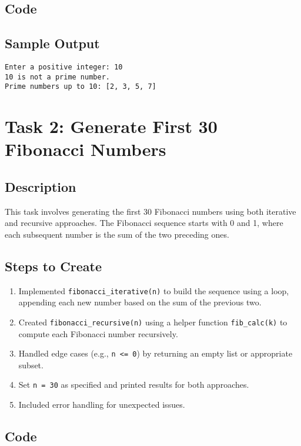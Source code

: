 \documentclass[a4paper,12pt]{article}
\begin{document}
\subsection{Code}


\subsection{Sample Output}
\begin{verbatim}
Enter a positive integer: 10
10 is not a prime number.
Prime numbers up to 10: [2, 3, 5, 7]
\end{verbatim}

\section{Task 2: Generate First 30 Fibonacci Numbers}
\subsection{Description}
This task involves generating the first 30 Fibonacci numbers using both iterative and recursive approaches. The Fibonacci sequence starts with 0 and 1, where each subsequent number is the sum of the two preceding ones.

\subsection{Steps to Create}
\begin{enumerate}
    \item Implemented \texttt{fibonacci\_iterative(n)} to build the sequence using a loop, appending each new number based on the sum of the previous two.
    \item Created \texttt{fibonacci\_recursive(n)} using a helper function \texttt{fib\_calc(k)} to compute each Fibonacci number recursively.
    \item Handled edge cases (e.g., \texttt{n <= 0}) by returning an empty list or appropriate subset.
    \item Set \texttt{n = 30} as specified and printed results for both approaches.
    \item Included error handling for unexpected issues.
\end{enumerate}

\subsection{Code}

\end{document}
